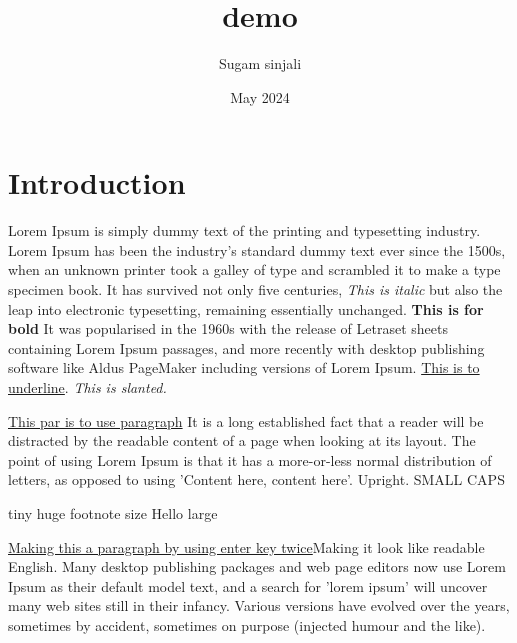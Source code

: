 \documentclass{article}
\title{demo}
\author{Sugam sinjali}
\date{May 2024}
\begin{document}
\maketitle

\section{Introduction}
Lorem Ipsum is simply dummy text of the printing and typesetting industry. Lorem Ipsum has been the industry's standard dummy text ever since the 1500s, when an unknown printer took a galley of type and scrambled it to make a type specimen book. It has survived not only five centuries, \textit{This is italic} but also the leap into electronic typesetting, remaining essentially unchanged. \textbf{This is for bold} It was popularised in the 1960s with the release of Letraset sheets containing Lorem Ipsum passages, and more recently with desktop publishing software like Aldus PageMaker including versions of Lorem Ipsum. \underline{This is to underline}.
\textsl{This is slanted.} \par \underline{This par is to use paragraph} It is a long established fact that a reader will be distracted by the readable content of a page when looking at its layout. The point of using Lorem Ipsum is that it has a more-or-less normal distribution of letters, as opposed to using 'Content here, content here'. \textup{Upright}. \textsc{SMALL CAPS}

{\tiny tiny }
{\huge huge}
{\footnotesize footnote size} Hello
{\LARGE large}
 
\par\underline{Making this a paragraph by using enter key twice}Making  it look like readable English. Many desktop publishing packages and web page editors now use Lorem Ipsum as their default model text, and a search for 'lorem ipsum' will uncover many web sites still in their infancy. Various versions have evolved over the years, sometimes by accident, sometimes on purpose (injected humour and the like).
\end{document}
